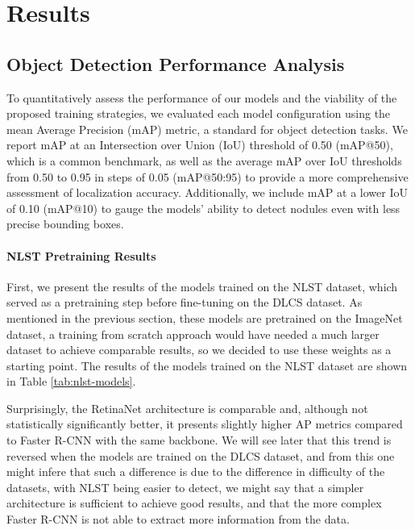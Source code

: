 \chapter{Results}
\label{chap:results}
\section{Object Detection Performance Analysis}

To quantitatively assess the performance of our models and the viability of the proposed training strategies, we evaluated each model configuration using the mean Average Precision (mAP) metric, a standard for object detection tasks. We report mAP at an Intersection over Union (IoU) threshold of 0.50 (mAP@50), which is a common benchmark, as well as the average mAP over IoU thresholds from 0.50 to 0.95 in steps of 0.05 (mAP@50:95) to provide a more comprehensive assessment of localization accuracy. Additionally, we include mAP at a lower IoU of 0.10 (mAP@10) to gauge the models' ability to detect nodules even with less precise bounding boxes.

\subsubsection{NLST Pretraining Results}
First, we present the results of the models trained on the NLST dataset, which served as a pretraining step before fine-tuning on the DLCS dataset.
As mentioned in the previous section, these models are pretrained on the ImageNet dataset, a training from scratch approach would have needed a much larger dataset to achieve comparable results, so we decided to use these weights as a starting point.
The results of the models trained on the NLST dataset are shown in Table \ref{tab:nlst-models}.



Surprisingly, the RetinaNet architecture is comparable and, although not statistically significantly better, it presents slightly higher AP metrics compared to Faster R-CNN with the same backbone.
We will see later that this trend is reversed when the models are trained on the DLCS dataset, and from this one might infere that such a difference is due to the difference in difficulty of the datasets, with NLST being easier to detect, we might say that a simpler architecture is sufficient to achieve good results, and that the more complex Faster R-CNN is not able to extract more information from the data.


